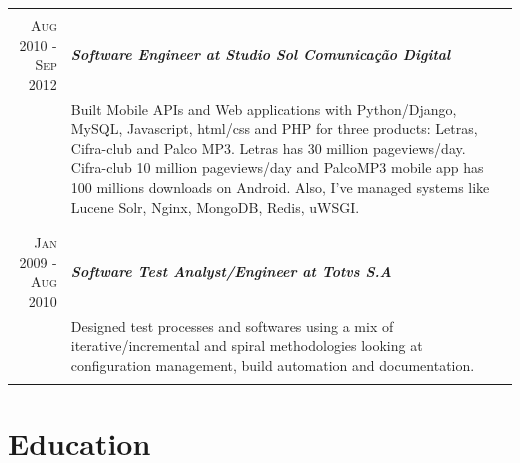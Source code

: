 \documentclass[a4paper,10pt]{article} %
\begin{document}
\begin{longtable}{r|p{11cm}}
\multicolumn{2}{c}{} \\



\textsc{Aug 2010 - Sep 2012} & \emph{\bf Software Engineer at Studio Sol
Comunicação Digital}  \\
& \footnotesize{Built Mobile APIs and Web applications with Python/Django,
	MySQL, Javascript, html/css and PHP for three products: Letras, Cifra-club
	and Palco MP3. Letras has 30 million pageviews/day. Cifra-club 10 million
	pageviews/day and PalcoMP3 mobile app has 100 millions downloads on
	Android. Also, I've managed systems like Lucene Solr, Nginx, MongoDB,
	Redis, uWSGI.} \\
\multicolumn{2}{c}{} \\

\\
\textsc{Jan 2009 - Aug 2010} & \emph{\bf Software Test Analyst/Engineer
at Totvs S.A} \\
& \footnotesize{Designed test processes and softwares using a mix
of iterative/incremental and spiral methodologies looking at
configuration management, build automation and documentation.} \\
\multicolumn{2}{c}{} \\

\end{longtable}



\section{Education}
\end{document}
